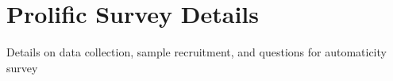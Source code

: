 \documentclass[12pt,letterpaper]{article}
\begin{document}
\section{Prolific Survey Details}\label{app:survey}

Details on data collection, sample recruitment, and questions for automaticity survey




\end{document}
